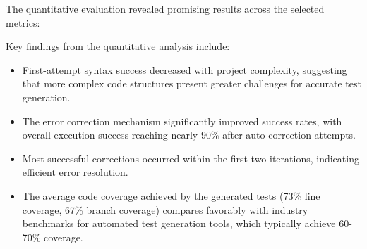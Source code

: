 The quantitative evaluation revealed promising results across the selected metrics:

\begin{table}[ht]
    \centering
    \caption{Test Generation Accuracy Metrics}
    \label{tab:accuracy-metrics}
\end{table}

Key findings from the quantitative analysis include:

\begin{itemize}
    \item First-attempt syntax success decreased with project complexity, suggesting that more complex code structures present greater challenges for accurate test generation.
    
    \item The error correction mechanism significantly improved success rates, with overall execution success reaching nearly 90\% after auto-correction attempts.
    
    \item Most successful corrections occurred within the first two iterations, indicating efficient error resolution.
    
    \item The average code coverage achieved by the generated tests (73\% line coverage, 67\% branch coverage) compares favorably with industry benchmarks for automated test generation tools, which typically achieve 60-70\% coverage.
\end{itemize}

